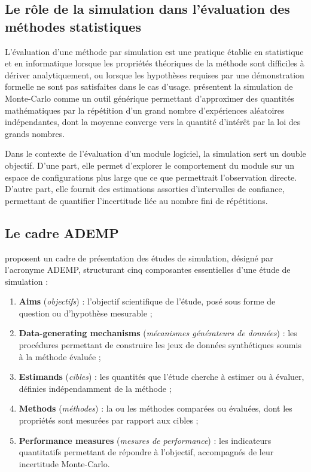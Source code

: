 \subsection{Le rôle de la simulation dans l'évaluation des méthodes statistiques}
\label{subsec:revue-simulation-role}

L'évaluation d'une méthode par simulation est une pratique établie en statistique et en
informatique lorsque les propriétés théoriques de la méthode sont difficiles à dériver
analytiquement, ou lorsque les hypothèses requises par une démonstration formelle ne sont
pas satisfaites dans le cas d'usage. \citet{Ribatet_nd} présentent la simulation de
Monte-Carlo comme un outil générique permettant d'approximer des quantités mathématiques
par la répétition d'un grand nombre d'expériences aléatoires indépendantes, dont la
moyenne converge vers la quantité d'intérêt par la loi des grands nombres.

Dans le contexte de l'évaluation d'un module logiciel, la simulation sert un double objectif.
D'une part, elle permet d'explorer le comportement du module sur un espace de configurations
plus large que ce que permettrait l'observation directe. D'autre part, elle fournit des
estimations assorties d'intervalles de confiance, permettant de quantifier l'incertitude
liée au nombre fini de répétitions.

\subsection{Le cadre ADEMP}
\label{subsec:revue-ademp}

\citet{Morris2019} proposent un cadre de présentation des études de simulation, désigné
par l'acronyme ADEMP, structurant cinq composantes essentielles d'une étude de simulation :

\begin{enumerate}
  \item \textbf{Aims} (\emph{objectifs}) : l'objectif scientifique de l'étude, posé sous
    forme de question ou d'hypothèse mesurable ;
  \item \textbf{Data-generating mechanisms} (\emph{mécanismes générateurs de données}) :
    les procédures permettant de construire les jeux de données synthétiques soumis à la
    méthode évaluée ;
  \item \textbf{Estimands} (\emph{cibles}) : les quantités que l'étude cherche à estimer ou
    à évaluer, définies indépendamment de la méthode ;
  \item \textbf{Methods} (\emph{méthodes}) : la ou les méthodes comparées ou évaluées, dont
    les propriétés sont mesurées par rapport aux cibles ;
  \item \textbf{Performance measures} (\emph{mesures de performance}) : les indicateurs
    quantitatifs permettant de répondre à l'objectif, accompagnés de leur incertitude Monte-Carlo.
\end{enumerate}


